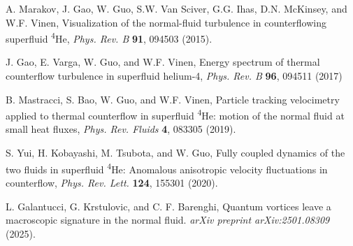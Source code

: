 \documentclass[a4paper,10pt]{article}
\begin{document}
\begin{thebibliography}{4}
    A. Marakov, J. Gao, W. Guo, S.W. Van Sciver, G.G. Ihas, D.N. McKinsey, and W.F. Vinen, Visualization of the normal-fluid turbulence in counterflowing superfluid \textsuperscript{4}He, \emph{Phys. Rev. B} \textbf{91}, 094503 (2015).

    J. Gao, E. Varga, W. Guo, and W.F. Vinen, Energy spectrum of thermal counterflow turbulence in superfluid helium-4, \emph{Phys. Rev. B} \textbf{96}, 094511 (2017)

    B. Mastracci, S. Bao, W. Guo, and W.F. Vinen, Particle tracking velocimetry applied to thermal counterflow in superfluid \textsuperscript{4}He: motion of the normal fluid at small heat fluxes, \emph{Phys. Rev. Fluids} \textbf{4}, 083305 (2019).

    S. Yui, H. Kobayashi, M. Tsubota, and W. Guo, Fully coupled dynamics of the two fluids in superfluid \textsuperscript{4}He: Anomalous anisotropic velocity fluctuations in counterflow, \emph{Phys. Rev. Lett.} \textbf{124}, 155301 (2020).

    L. Galantucci, G. Krstulovic, and C. F. Barenghi, Quantum vortices leave a macroscopic signature in the normal fluid. \emph{arXiv preprint arXiv:2501.08309} (2025).


\end{thebibliography}
\end{document}
